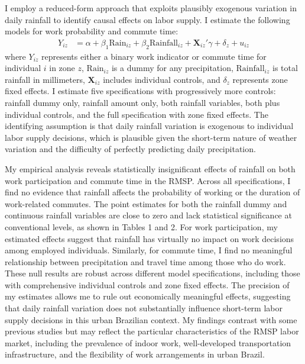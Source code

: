 I employ a reduced-form approach that exploits plausibly exogenous variation in daily rainfall to identify causal effects on labor supply. I estimate the following models for work probability and commute time:
\begin{align*}
Y_{iz} &= \alpha + \beta_1 \text{Rain}_{iz} + \beta_2 \text{Rainfall}_{iz} + \mathbf{X}_{iz}'\gamma + \delta_z + u_{iz}
\end{align*}
where $Y_{iz}$ represents either a binary work indicator or commute time for individual $i$ in zone $z$, $\text{Rain}_{iz}$ is a dummy for any precipitation, $\text{Rainfall}_{iz}$ is total rainfall in millimeters, $\mathbf{X}_{iz}$ includes individual controls, and $\delta_z$ represents zone fixed effects. I estimate five specifications with progressively more controls: rainfall dummy only, rainfall amount only, both rainfall variables, both plus individual controls, and the full specification with zone fixed effects. The identifying assumption is that daily rainfall variation is exogenous to individual labor supply decisions, which is plausible given the short-term nature of weather variation and the difficulty of perfectly predicting daily precipitation.

My empirical analysis reveals statistically insignificant effects of rainfall on both work participation and commute time in the RMSP. Across all specifications, I find no evidence that rainfall affects the probability of working or the duration of work-related commutes. The point estimates for both the rainfall dummy and continuous rainfall variables are close to zero and lack statistical significance at conventional levels, as shown in Tables 1 and 2. For work participation, my estimated effects suggest that rainfall has virtually no impact on work decisions among employed individuals. Similarly, for commute time, I find no meaningful relationship between precipitation and travel time among those who do work. These null results are robust across different model specifications, including those with comprehensive individual controls and zone fixed effects. The precision of my estimates allows me to rule out economically meaningful effects, suggesting that daily rainfall variation does not substantially influence short-term labor supply decisions in this urban Brazilian context. My findings contrast with some previous studies but may reflect the particular characteristics of the RMSP labor market, including the prevalence of indoor work, well-developed transportation infrastructure, and the flexibility of work arrangements in urban Brazil.

